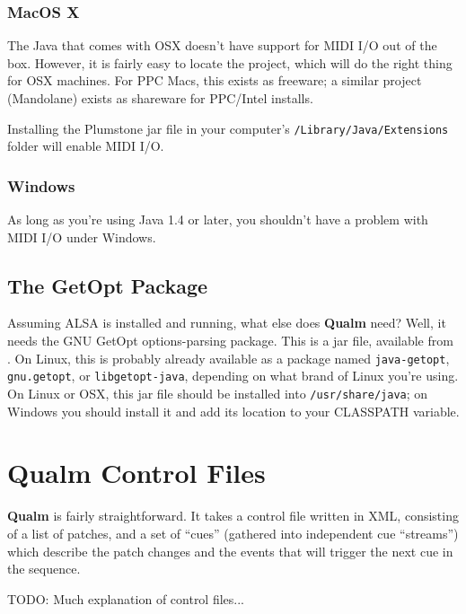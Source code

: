 \documentclass{article}
\newcommand{\q}{{\textsf{\textbf{Qualm}}}\xspace}
\newcommand{\code}[1]{{\tt #1}}
\begin{document}
\subsubsection{MacOS X}

The Java that comes with OSX doesn't have support for MIDI I/O out of
the box.  However, it is fairly easy to locate the
 project, which will
do the right thing for OSX machines.  For PPC Macs, this exists as
freeware; a similar project (Mandolane) exists as shareware for
PPC/Intel installs.

Installing the Plumstone jar file in your computer's
\code{/Li\-bra\-ry/Ja\-va/Ex\-ten\-sions} folder will enable MIDI I/O.

\subsubsection{Windows}

As long as you're using Java 1.4 or later, you shouldn't have a
problem with MIDI I/O under Windows.

\subsection{The GetOpt Package}

Assuming ALSA is installed and running, what else does \q need?  Well,
it needs the GNU GetOpt options-parsing package.  This is a jar file,
available from .  On
Linux, this is probably already available as a package named
\code{java-getopt}, \code{gnu.getopt}, or \code{libgetopt-java},
depending on what brand of Linux you're using.  On Linux or OSX, this
jar file should be installed into \code{/usr/share/java}; on Windows
you should install it and add its location to your CLASSPATH variable.

\section{\q Control Files}

\q is fairly straightforward.  It takes a control file written in
XML, consisting of a list of patches, and a set of ``cues'' (gathered into
independent cue ``streams'') which describe the patch changes and the
events that will trigger the next cue in the sequence.  

TODO: Much explanation of control files...
\end{document}
